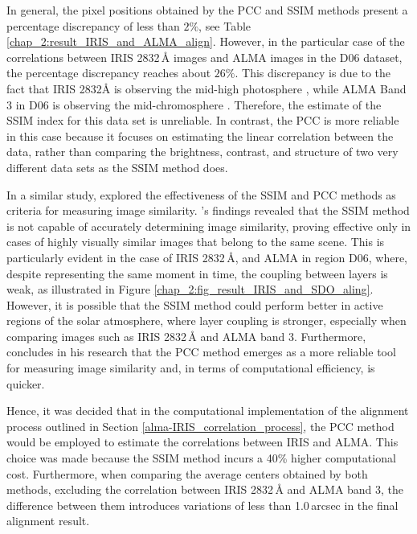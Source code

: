 \documentclass[a4paper,alpha-refs]{eSpectra}
\begin{document}
In general, the pixel positions obtained by the PCC and SSIM methods present a percentage discrepancy of less than $2\%$, see Table \ref{chap_2:result_IRIS_and_ALMA_align}.
However, in the particular case of the correlations between IRIS 2832\,Å images and ALMA images in the D06 dataset, the percentage discrepancy reaches about $26\%$. This discrepancy is due to the fact that IRIS 2832Å is observing the mid-high photosphere \cite{grubecka_height_2016}, while ALMA Band 3 in D06 is observing the mid-chromosphere \cite{wedemeyer_sun_2020_ALMA_band_3}. Therefore, the estimate of the SSIM index for this data set is unreliable. In contrast, the PCC is more reliable in this case because it focuses on estimating the linear correlation between the data, rather than comparing the brightness, contrast, and structure of two very different data sets as the SSIM method does.


In a similar study, \cite{sim_vs_pcc_2020} explored the effectiveness of the SSIM and PCC methods as criteria for measuring image similarity. \cite{sim_vs_pcc_2020}'s findings revealed that the SSIM method is not capable of accurately determining image similarity, proving effective only in cases of highly visually similar images that belong to the same scene. This is particularly evident in the case of IRIS 2832\,Å, and ALMA in region D06, where, despite representing the same moment in time, the coupling between layers is weak, as illustrated in Figure \ref{chap_2:fig_result_IRIS_and_SDO_aling}. 
However, it is possible that the SSIM method could perform better in active regions of the solar atmosphere, where layer coupling is stronger, especially when comparing images such as IRIS 2832\,Å and ALMA band 3.
Furthermore, \cite{sim_vs_pcc_2020} concludes in his research that the PCC method emerges as a more reliable tool for measuring image similarity and, in terms of computational efficiency, is quicker.




Hence, it was decided that in the computational implementation of the alignment process outlined in Section \ref{alma-IRIS_correlation_process}, the PCC method would be employed to estimate the correlations between IRIS and ALMA. This choice was made because the SSIM method incurs a 40\% higher computational cost. Furthermore, when comparing the average centers obtained by both methods, excluding the correlation between IRIS 2832\,Å and ALMA band 3, the difference between them introduces variations of less than 1.0\,arcsec in the final alignment result.
\end{document}
